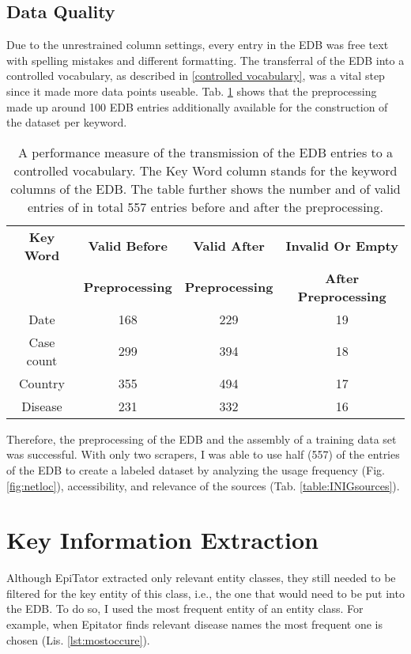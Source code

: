 \subsection{Data Quality}
  Due to the unrestrained column settings, every entry in the EDB was free text with spelling mistakes and different formatting.
  The transferral of the EDB into a controlled vocabulary, as described in \ref{controlled vocabulary}, was a vital step since it made more data points useable.
  Tab. \ref{table:preprocessing performance} shows that the preprocessing made up around 100 EDB entries additionally available for the construction of the dataset per keyword.

  \begin{table}[h!]
    \centering
    \caption{A performance measure of the transmission of the EDB entries to a controlled vocabulary. The Key Word column stands for the keyword columns of the EDB. The table further shows the number and of valid entries of in total 557 entries before and after the preprocessing.}
    \begin{tabular}{@{}cccc@{}}
      \toprule
      \textbf{Key Word} & \textbf{Valid Before} & \textbf{Valid After} & \textbf{Invalid Or Empty} \\
      & \textbf{Preprocessing} & \textbf{Preprocessing} & \textbf{After Preprocessing} \\
      \midrule
      Date& 168 & 229 &  19 \\
      Case count& 299 & 394 &  18 \\
      Country& 355 & 494 &  17 \\
      Disease& 231 & 332 & 16 \\
      \bottomrule
    \end{tabular}
  \label{table:preprocessing performance}
  \end{table}

  Therefore, the preprocessing of the EDB and the assembly of a training data set was successful.
  With only two scrapers, I was able to use half (557) of the entries of the EDB to create a labeled dataset by analyzing the usage frequency (Fig. \ref{fig:netloc}), accessibility, and relevance of the sources (Tab. \ref{table:INIGsources}).


\section{Key Information Extraction}
  Although EpiTator extracted only relevant entity classes, they still needed to be filtered for the key entity of this class, i.e., the one that would need to be put into the EDB.
  To do so, I used the most frequent entity of an entity class. For example, when Epitator finds relevant disease names the most frequent one is chosen (Lis. \ref{lst:mostoccure}).

